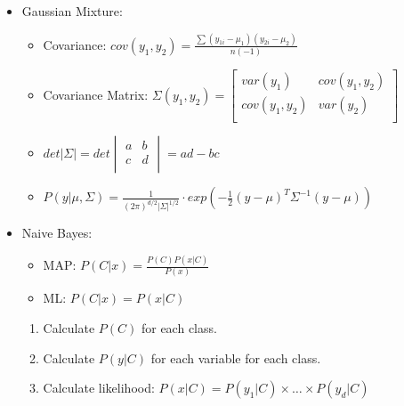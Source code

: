 \documentclass[twocolumn, 10pt]{article}
\begin{document}
\begin{itemize}[leftmargin=*, itemsep=0pt]
    \item Gaussian Mixture:
    \begin{itemize}[topsep=0pt]
        \item Covariance: $\displaystyle cov(y_1,y_2)=\frac{\sum(y_{1i}-\mu_1)(y_{2i}-\mu_2)}{n(-1)}$
        \item Covariance Matrix: $\Sigma(y_1,y_2)=
        \begin{bmatrix}
            var(y_1) & cov(y_1,y_2) \\
            cov(y_1,y_2) & var(y_2) \\
        \end{bmatrix}$
        \item $det\left\lvert\Sigma\right\rvert=det
        \begin{vmatrix}
            a & b \\
            c & d \\
        \end{vmatrix}
        = ad-bc$
        \item $\displaystyle P(y|\mu,\Sigma)=\frac{1}{(2\pi)^{d/2}|\Sigma|^{1/2}}\cdot exp\left(-\frac{1}{2}(y-\mu)^T\Sigma^{-1}(y-\mu)\right)$
    \end{itemize}

    \item Naive Bayes: 
    \begin{itemize}[topsep=0pt, itemsep=0pt]
        \item MAP: $\displaystyle P(C|x)=\frac{P(C)P(x|C)}{P(x)}$
        \item ML: $\displaystyle P(C|x)=P(x|C)$
    \end{itemize}
    \begin{enumerate}[topsep=0pt, itemsep=0pt]
        \item Calculate $P(C)$ for each class.
        \item Calculate $P(y|C)$ for each variable for each class.
        \item Calculate likelihood: $P(x|C)=P(y_1|C)\times\ldots\times P(y_d|C)$
    \end{enumerate}
    

\end{itemize}
\end{document}

